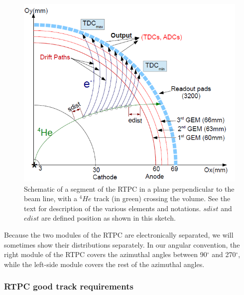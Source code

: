 \begin{figure}[tbp]
\centering
\vspace{-0.1in}
\includegraphics[scale=0.38]{fig_rtpc/RTPC_track.png}
\vspace{-0.1in}
\caption{Schematic of a segment of the RTPC in a plane perpendicular to the 
beam line, with a $^4He$ track (in green) crossing the volume. See the text for 
description of the various elements and notations. $sdist$ and $edist$ are 
defined position as shown in this sketch.} \label{fig:RTPC_track}
\end{figure}

Because the two modules of the RTPC are electronically separated, we will 
sometimes show their distributions separately. In our angular convention, the 
right module of the RTPC covers the azimuthal angles between 90$^{\circ}$ and 
270$^{\circ}$, while the left-side module covers the rest of the azimuthal 
angles. 

\subsubsection{RTPC good track requirements} \label{good_track_req}

